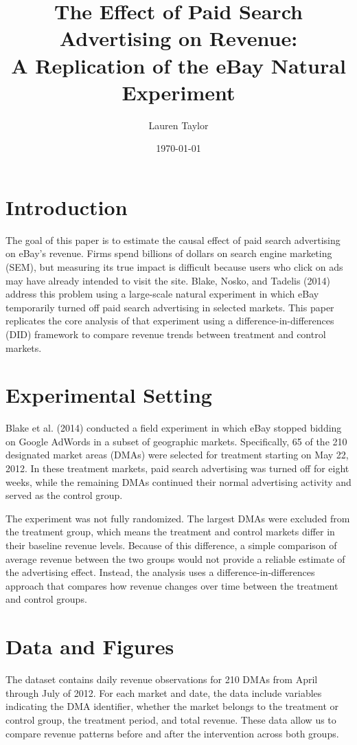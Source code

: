 \documentclass[12pt]{article}
\title{The Effect of Paid Search Advertising on Revenue: \\
A Replication of the eBay Natural Experiment}
\author{Lauren Taylor}
\date{\today}
\begin{document}
\maketitle

\section{Introduction}

The goal of this paper is to estimate the causal effect of paid search advertising on eBay's revenue. Firms spend billions of dollars on search engine marketing (SEM), but measuring its true impact is difficult because users who click on ads may have already intended to visit the site. Blake, Nosko, and Tadelis (2014) address this problem using a large-scale natural experiment in which eBay temporarily turned off paid search advertising in selected markets. This paper replicates the core analysis of that experiment using a difference-in-differences (DID) framework to compare revenue trends between treatment and control markets.

\section{Experimental Setting}

Blake et al. (2014) conducted a field experiment in which eBay stopped bidding on Google AdWords in a subset of geographic markets. Specifically, 65 of the 210 designated market areas (DMAs) were selected for treatment starting on May 22, 2012. In these treatment markets, paid search advertising was turned off for eight weeks, while the remaining DMAs continued their normal advertising activity and served as the control group.

The experiment was not fully randomized. The largest DMAs were excluded from the treatment group, which means the treatment and control markets differ in their baseline revenue levels. Because of this difference, a simple comparison of average revenue between the two groups would not provide a reliable estimate of the advertising effect. Instead, the analysis uses a difference-in-differences approach that compares how revenue changes over time between the treatment and control groups.

\section{Data and Figures}

The dataset contains daily revenue observations for 210 DMAs from April through July of 2012. For each market and date, the data include variables indicating the DMA identifier, whether the market belongs to the treatment or control group, the treatment period, and total revenue. These data allow us to compare revenue patterns before and after the intervention across both groups.
\end{document}
